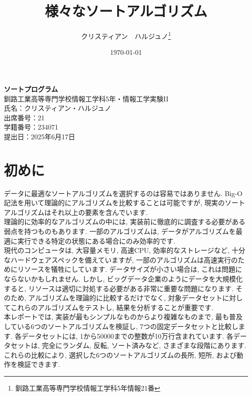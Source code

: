 \documentclass[a4j, 12pt]{jarticle}
\title{様々なソートアルゴリズム}
\author{クリスティアン　ハルジュノ\thanks{釧路工業高等専門学校情報工学科5年情報21番}}
\date{\today}
\begin{document}
\begin{titlepage}
  \centering
  \vspace*{3cm}

  {\fontsize{25pt}{36pt}\selectfont\bfseries ソートプログラム} \\[1cm]  %
  {\Large 釧路工業高等専門学校情報工学科5年・情報工学実験II} \\[1cm]
  {\large 氏名：クリスティアン・ハルジュノ} \\[1cm]
  {\large 出席番号：21} \\[1cm]
  {\large 学籍番号：234071} \\[5cm]


  {\Large 提出日：2025年6月17日} \\

  \vfill

\end{titlepage}
\section{初めに}
データに最適なソートアルゴリズムを選択するのは容易ではありません. Big-O記法を用いて理論的にアルゴリズムを比較することは可能ですが, 現実のソートアルゴリズムはそれ以上の要素を含んでいます. \\

理論的に効率的なアルゴリズムの中には, 実装前に徹底的に調査する必要がある弱点を持つものもあります. 一部のアルゴリズムは, データがアルゴリズムを最適に実行できる特定の状態にある場合にのみ効率的です. \\

現代のコンピュータは, 大容量メモリ, 高速CPU, 効率的なストレージなど, 十分なハードウェアスペックを備えていますが, 一部のアルゴリズムは高速実行のためにリソースを犠牲にしています. データサイズが小さい場合は, これは問題にならないかもしれません. しかし, ビッグデータ企業のようにデータを大規模化すると, リソースは適切に対処する必要がある非常に重要な問題になります. そのため, アルゴリズムを理論的に比較するだけでなく, 対象データセットに対してこれらのアルゴリズムをテストし, 結果を分析することが重要です. \\

本レポートでは, 実装が最もシンプルなものからより複雑なものまで, 最も普及している6つのソートアルゴリズムを検証し, 7つの固定データセットと比較します. 各データセットには, 1から50000までの整数が10万行含まれています. 各データセットは, 完全にランダム, 反転, ソート済みなど, さまざまな段階にあります. これらの比較により, 選択した6つのソートアルゴリズムの長所, 短所, および動作を検証できます. \\
\end{document}
